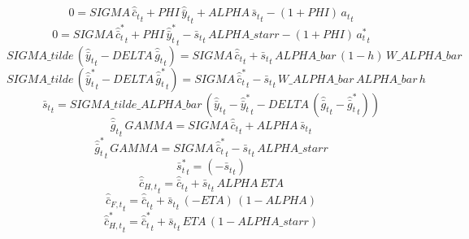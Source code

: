 \begin{dmath}
0={SIGMA}\, {{\hat {\bar c}_t}}_{t}+{PHI}\, {{\hat {\bar y}_t}}_{t}+{ALPHA}\, {{\bar s_t}}_{t}-\left(1+{PHI}\right)\, {{a_t}}_{t}
\end{dmath}
\begin{dmath}
0={SIGMA}\, {{\hat {\bar c}_t^*}}_{t}+{PHI}\, {{\hat {\bar y}_t^*}}_{t}-{{\bar s_t}}_{t}\, {ALPHA\_starr}-\left(1+{PHI}\right)\, {{a_t^*}}_{t}
\end{dmath}
\begin{dmath}
{SIGMA\_tilde}\, \left({{\hat {\bar y}_t}}_{t}-{DELTA}\, {{\hat {\bar g}_t}}_{t}\right)={SIGMA}\, {{\hat {\bar c}_t}}_{t}+{{\bar s_t}}_{t}\, {ALPHA\_bar}\, \left(1-{h}\right)\, {W\_ALPHA\_bar}
\end{dmath}
\begin{dmath}
{SIGMA\_tilde}\, \left({{\hat {\bar y}_t^*}}_{t}-{DELTA}\, {{\hat {\bar g}_t^*}}_{t}\right)={SIGMA}\, {{\hat {\bar c}_t^*}}_{t}-{{\bar s_t}}_{t}\, {W\_ALPHA\_bar}\, {ALPHA\_bar}\, {h}
\end{dmath}
\begin{dmath}
{{\bar s_t}}_{t}={SIGMA\_tilde\_ALPHA\_bar}\, \left({{\hat {\bar y}_t}}_{t}-{{\hat {\bar y}_t^*}}_{t}-{DELTA}\, \left({{\hat {\bar g}_t}}_{t}-{{\hat {\bar g}_t^*}}_{t}\right)\right)
\end{dmath}
\begin{dmath}
{{\hat {\bar g}_t}}_{t}\, {GAMMA}={SIGMA}\, {{\hat {\bar c}_t}}_{t}+{ALPHA}\, {{\bar s_t}}_{t}
\end{dmath}
\begin{dmath}
{{\hat {\bar g}_t^*}}_{t}\, {GAMMA}={SIGMA}\, {{\hat {\bar c}_t^*}}_{t}-{{\bar s_t}}_{t}\, {ALPHA\_starr}
\end{dmath}
\begin{dmath}
{{\bar s_t^*}}_{t}=\left(-{{\bar s_t}}_{t}\right)
\end{dmath}
\begin{dmath}
{{\hat {\bar c}_{H,t}}}_{t}={{\hat {\bar c}_t}}_{t}+{{\bar s_t}}_{t}\, {ALPHA}\, {ETA}
\end{dmath}
\begin{dmath}
{{\hat {\bar c}_{F,t}}}_{t}={{\hat {\bar c}_t}}_{t}+{{\bar s_t}}_{t}\, \left(-{ETA}\right)\, \left(1-{ALPHA}\right)
\end{dmath}
\begin{dmath}
{{\hat {\bar c}_{H,t}^*}}_{t}={{\hat {\bar c}_t^*}}_{t}+{{\bar s_t}}_{t}\, {ETA}\, \left(1-{ALPHA\_starr}\right)
\end{dmath}
